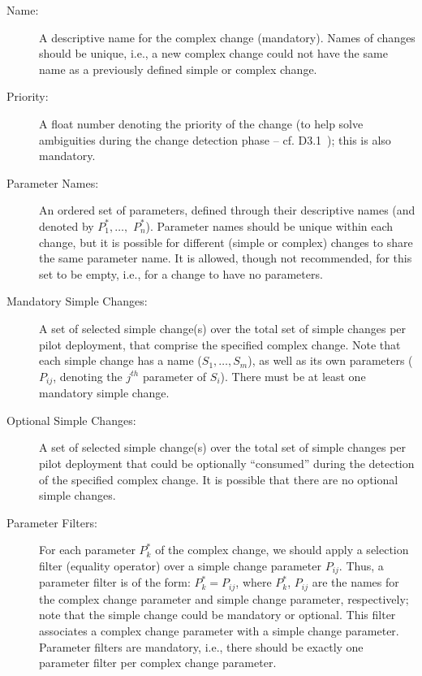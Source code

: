\begin{description}

\item[Name:] A descriptive name for the complex change (mandatory). Names of changes should be unique, i.e., a new complex change could not have the same name as a previously defined simple or complex change.

\item[Priority:] A float number denoting the priority of the change (to help solve ambiguities during the change detection phase -- cf. D3.1~\cite{d3.1}); this is also mandatory.

\item[Parameter Names:] An ordered set of parameters, defined through their descriptive names (and denoted by $P^*_1, \dots,$ $P^*_n$).
Parameter names should be unique within each change, but it is possible for different (simple or complex) changes to share the same parameter name.
It is allowed, though not recommended, for this set to be empty, i.e., for a change to have no parameters.

\item[Mandatory Simple Changes:] A set of selected simple change(s) over the total set of simple changes per pilot deployment, that comprise the specified complex change. Note that each simple change has a name ($S_1,\dots,S_m$), as well as its own parameters ($P_{ij}$, denoting the $j^{th}$ parameter of $S_i$). There must be at least one mandatory simple change.

\item[Optional Simple Changes:] A set of selected simple change(s) over the total set of simple changes per pilot deployment that could be optionally ``consumed'' during the detection of the specified complex change. It is possible that there are no optional simple changes.

\item[Parameter Filters:] For each parameter $P^*_k$ of the complex change, we should apply a selection filter (equality operator) over a simple change parameter $P_{ij}$. 
Thus, a parameter filter is of the form: $P^*_k = P_{ij}$, where $P^*_k$, $P_{ij}$ are the names for the complex change parameter and simple change parameter, respectively; note that the simple change could be mandatory or optional. 
This filter associates a complex change parameter with a simple change parameter. 
Parameter filters are mandatory, i.e., there should be exactly one parameter filter per complex change parameter.


\end{description}
